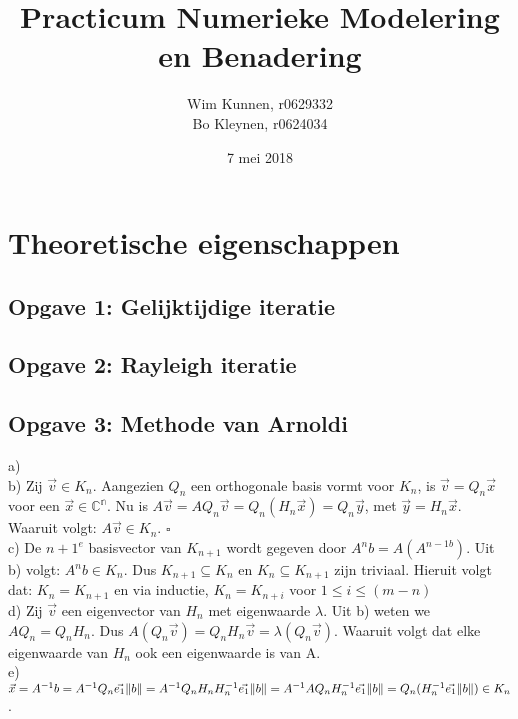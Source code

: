 \documentclass[a4paper]{article}
\title{Practicum Numerieke Modelering en Benadering}
\author{Wim Kunnen, r0629332 \\ Bo Kleynen, r0624034}
\date{7 mei 2018}
\newcommand*{\qed}{\hfill\ensuremath{\square}}
\newcommand{\opgave}[1]{\subsection{Opgave #1}}
\begin{document}
\begin{titlepage}
\maketitle
\thispagestyle{empty}
\end{titlepage}


\setcounter{page}{1}
\tableofcontents
\cleardoublepage

\listoffigures
{}

\listoftables
{}

\lstlistoflistings
{}

\cleardoublepage



\setcounter{page}{1}

\section{Theoretische eigenschappen}\label{sec:theorie}

\opgave{1: Gelijktijdige iteratie}\label{sec:oef1}

\opgave{2: Rayleigh iteratie}\label{sec:oef2}

\opgave{3: Methode van Arnoldi}\label{sec:oef3}
a)  \\
\newline
b)  Zij $\vec{v} \in K_n$. Aangezien $Q_n$ een orthogonale basis vormt voor $K_n$, is $\vec{v} = Q_n\vec{x}$ voor een $\vec{x} \in \mathbb{C^{n}}$. Nu is $A \vec{v} = AQ_n\vec{v} = Q_n(H_n\vec{x}) = Q_n\vec{y}$, met $\vec{y} = H_n\vec{x} $.  Waaruit volgt: $A\vec{v} \in K_n$. \qed\\
\newline
c) De $n+1^e$ basisvector van $K_{n+1}$ wordt gegeven door $ A^nb = A(A^{n-1b}) $. Uit b) volgt: $A^nb \in K_n$. Dus $K_{n+1} \subseteq K_n$ en $K_{n} \subseteq K_{n+1}$ zijn triviaal. Hieruit volgt dat: $K_n = K_{n+1}$ en via inductie, $K_n = K_{n+i}$ voor $1 \leq i \leq (m-n)$\\
\newline
d) Zij $\vec{v}$ een eigenvector van $H_n$ met eigenwaarde $\lambda$. Uit b) weten we $AQ_n = Q_nH_n$. Dus $A(Q_n\vec{v}) = Q_nH_n\vec{v} = \lambda(Q_n\vec{v})$. Waaruit volgt dat elke eigenwaarde van $H_n$ ook een eigenwaarde is van A.\\
\newline
e) $\vec{x} = A^{-1}b = A^{-1}Q_n\vec{e_1}\norm{b} = A^{-1}Q_nH_nH_n^{-1}\vec{e_1}\norm{b} = A^{-1}AQ_nH_n^{-1}\vec{e_1}\norm{b} = Q_n(H_n^{-1}\vec{e_1}\norm{b}) \in K_n$.
\end{document}
